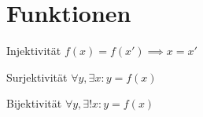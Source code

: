 \section{Funktionen}

\begin{thirdboxl}
    \begin{defi}{Injektivität}
        $f(x) = f(x')\implies x = x'$
    \end{defi}
\end{thirdboxl}%
\begin{thirdboxm}
    \begin{defi}{Surjektivität}
        $\forall y, \exists x: y = f(x)$
    \end{defi}
\end{thirdboxm}%
\begin{thirdboxr}
    \begin{defi}{Bijektivität}
        $\forall y, \exists! x: y = f(x)$
    \end{defi}
\end{thirdboxr}%